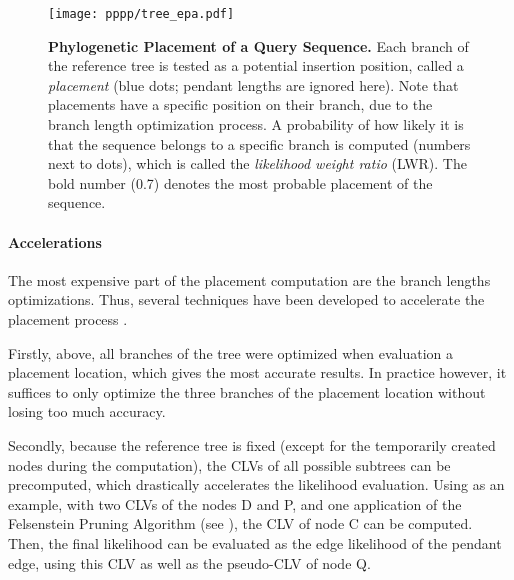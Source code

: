 \begin{figure}[hpbt]
    \centering
    \texttt{[image: pppp/tree\_epa.pdf]}
    \caption[Phylogenetic Placement of a Query Sequence]{
        \textbf{Phylogenetic Placement of a Query Sequence.}
        Each branch of the reference tree is tested as a potential insertion position, called a \emph{placement}
        (blue dots; pendant lengths are ignored here).
        Note that placements have a specific position on their branch, due to the branch length optimization process.
        A probability of how likely it is that the sequence belongs to a specific branch is computed
        (numbers next to dots),
        which is called the \emph{likelihood weight ratio} (LWR).
        The bold number (0.7) denotes the most probable placement of the sequence.
    }
    \label{fig:tree_epa}
\end{figure}

\paragraph{Accelerations}
\label{ch:Foundations:sec:PhylogeneticPlacement:sub:PipelineAndComputation:par:Accelerations}

The most expensive part of the placement computation are the branch lengths optimizations.
Thus, several techniques have been developed to accelerate the placement process \cite{Barbera2018}.

Firstly, above, all branches of the tree were optimized when evaluation a placement location,
which gives the most accurate results.
In practice however, it suffices to only optimize the three branches of the placement location
without losing too much accuracy.

Secondly, because the reference tree is fixed (except for the temporarily created nodes during the computation),
the CLVs of all possible subtrees can be precomputed,
which drastically accelerates the likelihood evaluation.
Using  as an example,
with two CLVs of the nodes {\sffamily D} and {\sffamily P}, and one application of the Felsenstein Pruning Algorithm
(see ),
the CLV of node {\sffamily C} can be computed.
Then, the final likelihood can be evaluated as the edge likelihood of the pendant edge,
using this CLV as well as the pseudo-CLV of node {\sffamily Q}.

